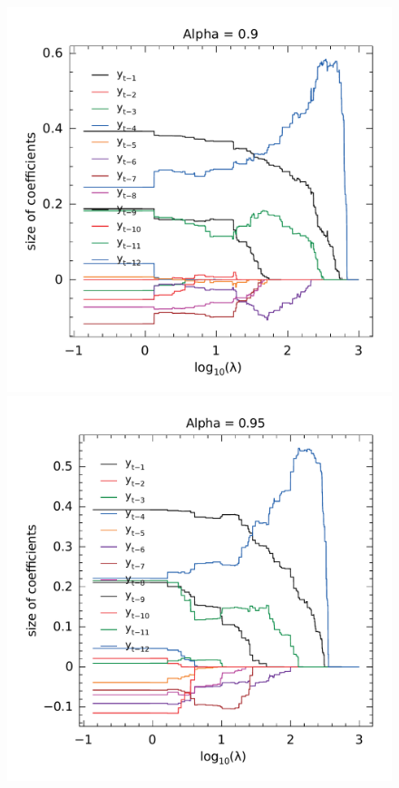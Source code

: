 \begin{figure}
\begin{minipage}[t]{0.4\linewidth}
\begin{minipage}[b]{\linewidth}
		\end{minipage}
	\end{minipage}
	\begin{minipage}[t]{0.4\linewidth}
		\centering
		\begin{minipage}[b]{\linewidth}
			\centering     \includegraphics[width=\textwidth]{Figuras/selecao-lasso/par-sellasso-09.pdf}
		\end{minipage}
		\begin{minipage}[b]{\linewidth}
			\centering     \includegraphics[width=\textwidth]{Figuras/selecao-lasso/par-sellasso-095.pdf}

\end{minipage}
\end{minipage}
\end{figure}
